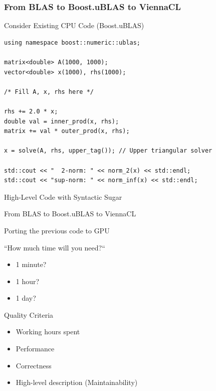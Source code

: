 \begin{frame}[fragile]
\frametitle{From BLAS to Boost.uBLAS to ViennaCL}
\begin{block}{Consider Existing CPU Code (Boost.uBLAS)}
  \begin{lstlisting}
using namespace boost::numeric::ublas;

matrix<double> A(1000, 1000);
vector<double> x(1000), rhs(1000);

/* Fill A, x, rhs here */

rhs += 2.0 * x;
double val = inner_prod(x, rhs);
matrix += val * outer_prod(x, rhs);

x = solve(A, rhs, upper_tag()); // Upper triangular solver

std::cout << "  2-norm: " << norm_2(x) << std::endl;
std::cout << "sup-norm: " << norm_inf(x) << std::endl;
  \end{lstlisting}
\end{block}

\begin{block}{High-Level Code with Syntactic Sugar}
\end{block}

\end{frame}


\begin{frame}{From BLAS to Boost.uBLAS to ViennaCL}

  \begin{block}{Porting the previous code to GPU}
  \end{block}

  \begin{block}{``How much time will you need{?}``}
    \begin{itemize}
     \item 1 minute?
     \item 1 hour?
     \item 1 day?
    \end{itemize}
  \end{block}

  \begin{block}{Quality Criteria}
   \begin{itemize}
     \item Working hours spent
     \item Performance
     \item Correctness
     \item High-level description (Maintainability)
   \end{itemize}
  \end{block}

\end{frame}


